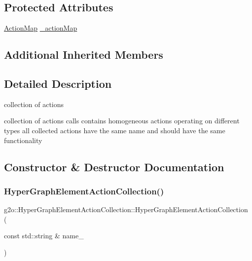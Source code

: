 \subsection*{Protected Attributes}
\begin{DoxyCompactItemize}
\item 
\mbox{\hyperlink{classg2o_1_1_hyper_graph_element_action_abc889fc90ae1bbb63d90c7993777417a}{Action\+Map}} \mbox{\hyperlink{classg2o_1_1_hyper_graph_element_action_collection_a637c13fca95eacab38ee82eedd3669e4}{\+\_\+action\+Map}}
\end{DoxyCompactItemize}
\subsection*{Additional Inherited Members}


\subsection{Detailed Description}
collection of actions 

collection of actions calls contains homogeneous actions operating on different types all collected actions have the same name and should have the same functionality 

\subsection{Constructor \& Destructor Documentation}
\mbox{\label{classg2o_1_1_hyper_graph_element_action_collection_a6af1ca2dfcdc0894eb594c68135dd614}} 
\subsubsection{\texorpdfstring{Hyper\+Graph\+Element\+Action\+Collection()}{HyperGraphElementActionCollection()}}
{\footnotesize\ttfamily g2o\+::\+Hyper\+Graph\+Element\+Action\+Collection\+::\+Hyper\+Graph\+Element\+Action\+Collection (\begin{DoxyParamCaption}\item[{const std\+::string \&}]{name\+\_\+ }\end{DoxyParamCaption})}



